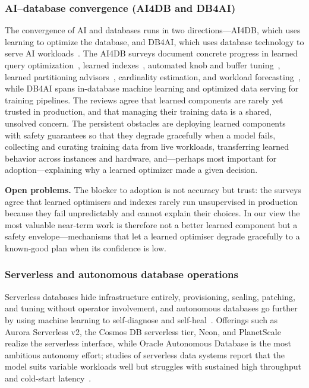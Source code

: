 \documentclass[a4paper,fleqn]{cas-sc}
\begin{document}
\subsubsection{AI--database convergence (AI4DB and DB4AI)}
\label{subsubsec:ai4db}

The convergence of AI and databases runs in two directions---AI4DB, which uses learning to optimize the database, and DB4AI, which uses database technology to serve AI workloads~\cite{Zhou2022AI4DB}. The AI4DB surveys document concrete progress in learned query optimization~\cite{Marcus2021Bao}, learned indexes~\cite{Kraska2018LearnedIndex,Zhao2026SpatialIndex,Woltmann2023DNNIndex}, automated knob and buffer tuning~\cite{Zhang2022CDBTune,Tan2019iBTune}, learned partitioning advisors~\cite{Hilprecht2020Partitioning}, cardinality estimation, and workload forecasting~\cite{Ma2021LearnedWorkload,Dritsas2026MLDB}, while DB4AI spans in-database machine learning and optimized data serving for training pipelines. The reviews agree that learned components are rarely yet trusted in production, and that managing their training data is a shared, unsolved concern. The persistent obstacles are deploying learned components with safety guarantees so that they degrade gracefully when a model fails, collecting and curating training data from live workloads, transferring learned behavior across instances and hardware, and---perhaps most important for adoption---explaining why a learned optimizer made a given decision.

\textbf{Open problems.} The blocker to adoption is not accuracy but trust: the surveys agree that learned optimisers and indexes rarely run unsupervised in production because they fail unpredictably and cannot explain their choices. In our view the most valuable near-term work is therefore not a better learned component but a safety envelope---mechanisms that let a learned optimiser degrade gracefully to a known-good plan when its confidence is low.

\subsubsection{Serverless and autonomous database operations}
\label{subsubsec:serverless}

Serverless databases hide infrastructure entirely, provisioning, scaling, patching, and tuning without operator involvement, and autonomous databases go further by using machine learning to self-diagnose and self-heal~\cite{Pavlo2017SelfDriving,Muller2020Serverless}. Offerings such as Aurora Serverless v2, the Cosmos DB serverless tier, Neon, and PlanetScale realize the serverless interface, while Oracle Autonomous Database is the most ambitious autonomy effort; studies of serverless data systems report that the model suits variable workloads well but struggles with sustained high throughput and cold-start latency~\cite{Muller2020Serverless}.
\end{document}
